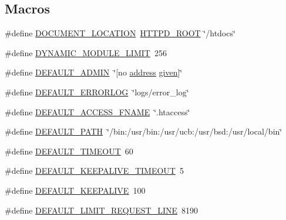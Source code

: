 \subsection*{Macros}
\begin{DoxyCompactItemize}
\item 
\#define \hyperlink{group__APACHE__CORE__DAEMON_gafbc041e73ff5e4698c985ea902af7c5a}{D\+O\+C\+U\+M\+E\+N\+T\+\_\+\+L\+O\+C\+A\+T\+I\+ON}~\hyperlink{ap__config__auto_8h_a0bd140f3348de0944514ff605c585016}{H\+T\+T\+P\+D\+\_\+\+R\+O\+OT} \char`\"{}/htdocs\char`\"{}
\item 
\#define \hyperlink{group__APACHE__CORE__DAEMON_ga7e7af5ed7b4f1713e6bc405b01a31617}{D\+Y\+N\+A\+M\+I\+C\+\_\+\+M\+O\+D\+U\+L\+E\+\_\+\+L\+I\+M\+IT}~256
\item 
\#define \hyperlink{group__APACHE__CORE__DAEMON_gaa01f09b9d40369ba1f14b88005897d5f}{D\+E\+F\+A\+U\+L\+T\+\_\+\+A\+D\+M\+IN}~\char`\"{}\mbox{[}no \hyperlink{pcre_8txt_a50a1f7a1407aa5acc342dab031a6ca50}{address} \hyperlink{pcregrep_8txt_a9dffb3dde41716fc3bef8d0ee982f378}{given}\mbox{]}\char`\"{}
\item 
\#define \hyperlink{group__APACHE__CORE__DAEMON_ga6a9ad3e96d60dc6c82112be50b73bbb4}{D\+E\+F\+A\+U\+L\+T\+\_\+\+E\+R\+R\+O\+R\+L\+OG}~\char`\"{}logs/error\+\_\+log\char`\"{}
\item 
\#define \hyperlink{group__APACHE__CORE__DAEMON_gaabffdcb2c80cb7d6221a5e468b8b2b24}{D\+E\+F\+A\+U\+L\+T\+\_\+\+A\+C\+C\+E\+S\+S\+\_\+\+F\+N\+A\+ME}~\char`\"{}.htaccess\char`\"{}
\item 
\#define \hyperlink{group__APACHE__CORE__DAEMON_ga72c1937b26ce9a87266ca6c802b047a0}{D\+E\+F\+A\+U\+L\+T\+\_\+\+P\+A\+TH}~\char`\"{}/bin\+:/usr/bin\+:/usr/ucb\+:/usr/bsd\+:/usr/local/bin\char`\"{}
\item 
\#define \hyperlink{group__APACHE__CORE__DAEMON_gaad2dd72565852b91c809cd4685833b17}{D\+E\+F\+A\+U\+L\+T\+\_\+\+T\+I\+M\+E\+O\+UT}~60
\item 
\#define \hyperlink{group__APACHE__CORE__DAEMON_ga2cd430599decbe43ab75edf8a23e1466}{D\+E\+F\+A\+U\+L\+T\+\_\+\+K\+E\+E\+P\+A\+L\+I\+V\+E\+\_\+\+T\+I\+M\+E\+O\+UT}~5
\item 
\#define \hyperlink{group__APACHE__CORE__DAEMON_ga2155d4b485c3a06e1df1c88596db9f06}{D\+E\+F\+A\+U\+L\+T\+\_\+\+K\+E\+E\+P\+A\+L\+I\+VE}~100
\item 
\#define \hyperlink{group__APACHE__CORE__DAEMON_ga085b56b77705764631506c08e928e5d7}{D\+E\+F\+A\+U\+L\+T\+\_\+\+L\+I\+M\+I\+T\+\_\+\+R\+E\+Q\+U\+E\+S\+T\+\_\+\+L\+I\+NE}~8190
\item 

\end{DoxyCompactItemize}
